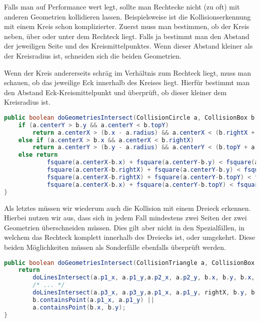 Falls man auf Performance wert legt, sollte man Rechtecke nicht (zu oft) mit anderen Geometrien kollidieren lassen. Beispielsweise ist die Kollisionserkennung mit einem Kreis schon komplizierter.
Zuerst muss man bestimmen, ob der Kreis neben, über oder unter dem Rechteck liegt. Falls ja bestimmt man den Abstand der jeweiligen Seite und des Kreismittelpunktes. Wenn dieser Abstand kleiner als der Kreisradius ist, schneiden sich die beiden Geometrien.


Wenn der Kreis andererseits schräg im Verhältnis zum Rechteck liegt, muss man schauen, ob das jeweilige Eck innerhalb des Kreises liegt. Hierfür bestimmt man den Abstand Eck-Kreismittelpunkt und überprüft, ob dieser kleiner dem Kreisradius ist.


\doinline
\begin{lstlisting}[caption=Erkennen von Kollisionen (Kreis-Box), title=\hspace{0 pt}, language=java]
public boolean doGeometriesIntersect(CollisionCircle a, CollisionBox b) {
	if (a.centerY > b.y && a.centerY < b.topY)
		return a.centerX > (b.x - a.radius) && a.centerX < (b.rightX + a.radius);
	else if (a.centerX > b.x && a.centerX < b.rightX)
		return a.centerY > (b.y - a.radius) && a.centerY < (b.topY + a.radius);
	else return 
			fsquare(a.centerX-b.x) + fsquare(a.centerY-b.y) < fsquare(a.radius) ||
			fsquare(a.centerX-b.rightX) + fsquare(a.centerY-b.y) < fsquare(a.radius) ||
			fsquare(a.centerX-b.rightX) + fsquare(a.centerY-b.topY) < fsquare(a.radius) ||
			fsquare(a.centerX-b.x) + fsquare(a.centerY-b.topY) < fsquare(a.radius);
}
\end{lstlisting}

Als letztes müssen wir wiederum auch die Kollision mit einem Dreieck erkennen. Hierbei nutzen wir aus, dass sich in jedem Fall mindestens zwei Seiten der zwei Geometrien überschneiden müssen. Dies gilt aber nicht in den Spezialfällen, in welchem das Rechteck komplett innerhalb des Dreiecks ist, oder umgekehrt. Diese beiden Möglichkeiten müssen als Sonderfälle ebenfalls überprüft werden.

\doinline
\begin{lstlisting}[caption=Erkennen von Kollisionen (Box-Dreieck), title=\hspace{0 pt}, language=java]
public boolean doGeometriesIntersect(CollisionTriangle a, CollisionBox b) {od
	return 
		doLinesIntersect(a.p1_x, a.p1_y,a.p2_x, a.p2_y, b.x, b.y, b.x, b.topY) ||
		/* ... */
		doLinesIntersect(a.p3_x, a.p3_y,a.p1_x, a.p1_y, rightX, b.y, b.x, b.y) ||
		b.containsPoint(a.p1_x, a.p1_y) ||
		a.containsPoint(b.x, b.y);
}
\end{lstlisting}

